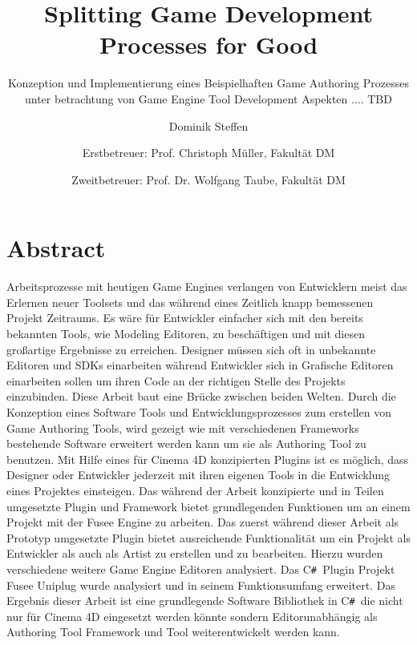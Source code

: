 \documentclass[pagesize, paper=a4, fontsize=12pt, titlepage=true, headings=small, headnosepline, abstractoff, liststotoc, nochapterprefix, plainheadsepline, twoside]{scrreprt}
\author{
Dominik Steffen \and
Erstbetreuer: Prof. Christoph Müller, Fakultät DM \and
Zweitbetreuer: Prof. Dr. Wolfgang Taube, Fakultät DM
}
\title{Splitting Game Development Processes for Good}
\subtitle{Konzeption und Implementierung eines Beispielhaften Game Authoring Prozesses unter betrachtung von Game Engine Tool Development Aspekten .... TBD}
\newcommand{\CSS}{C\texttt{\# }}
\begin{document}



\newpage
\thispagestyle{empty}
\mbox{}

\begingroup
\newpage
\pagestyle{empty}
\renewcommand*{\chapterpagestyle}{empty}
\chapter*{Abstract}%
Arbeitsprozesse mit heutigen Game Engines verlangen von Entwicklern meist das Erlernen neuer Toolsets und das während eines Zeitlich knapp bemessenen Projekt Zeitraums. Es wäre für Entwickler einfacher sich mit den bereits bekannten Tools, wie Modeling Editoren, zu beschäftigen und mit diesen großartige Ergebnisse zu erreichen. Designer müssen sich oft in unbekannte Editoren und SDKs einarbeiten während Entwickler sich in Grafische Editoren einarbeiten sollen um ihren Code an der richtigen Stelle des Projekts einzubinden.
Diese Arbeit baut eine Brücke zwischen beiden Welten. Durch die Konzeption eines Software Tools und Entwicklungsprozesses zum erstellen von Game Authoring Tools, wird gezeigt wie mit verschiedenen Frameworks bestehende Software erweitert werden kann um sie als Authoring Tool zu benutzen. Mit Hilfe eines für Cinema 4D konzipierten Plugins ist es möglich, dass Designer oder Entwickler jederzeit mit ihren eigenen Tools in die Entwicklung eines Projektes einsteigen. Das während der Arbeit konzipierte und in Teilen umgesetzte Plugin und Framework bietet grundlegenden Funktionen um an einem Projekt mit der Fusee Engine zu arbeiten.
Das zuerst während dieser Arbeit als Prototyp umgesetzte Plugin bietet ausreichende Funktionalität um ein Projekt als Entwickler als auch als Artist zu erstellen und zu bearbeiten. Hierzu wurden verschiedene weitere Game Engine Editoren analysiert. Das \CSS Plugin Projekt Fusee Uniplug wurde analysiert und in seinem Funktionsumfang erweitert. Das Ergebnis dieser Arbeit ist eine grundlegende Software Bibliothek in \CSS die nicht nur für Cinema 4D eingesetzt werden könnte sondern Editorunabhängig als Authoring Tool Framework und Tool weiterentwickelt werden kann.
\end{document}
